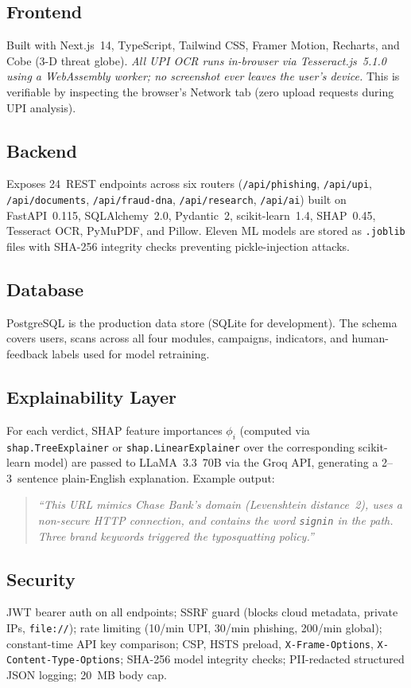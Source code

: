 \documentclass[conference]{IEEEtran}
\begin{document}
\subsection{Frontend}
Built with Next.js~14, TypeScript, Tailwind CSS, Framer Motion,
Recharts, and Cobe (3-D threat globe).
\emph{All UPI OCR runs in-browser via Tesseract.js~5.1.0 using a
WebAssembly worker; no screenshot ever leaves the user's device.}
This is verifiable by inspecting the browser's Network tab (zero upload
requests during UPI analysis).

\subsection{Backend}
Exposes 24~REST endpoints across six routers
(\texttt{/api/phishing}, \texttt{/api/upi}, \texttt{/api/documents},
\texttt{/api/fraud-dna}, \texttt{/api/research}, \texttt{/api/ai})
built on FastAPI~0.115, SQLAlchemy~2.0, Pydantic~2,
scikit-learn~1.4, SHAP~0.45, Tesseract OCR, PyMuPDF, and Pillow.
Eleven ML models are stored as \texttt{.joblib} files with SHA-256
integrity checks preventing pickle-injection attacks.

\subsection{Database}
PostgreSQL is the production data store (SQLite for development).
The schema covers users, scans across all four modules, campaigns,
indicators, and human-feedback labels used for model retraining.

\subsection{Explainability Layer}\label{sec:explayer}
For each verdict, SHAP feature importances $\phi_i$ (computed via
\texttt{shap.TreeExplainer} or \texttt{shap.LinearExplainer} over the
corresponding scikit-learn model) are passed to LLaMA~3.3~70B via the
Groq API, generating a 2--3~sentence plain-English explanation.
Example output:
\begin{quote}
\small\textit{``This URL mimics Chase Bank's domain (Levenshtein
distance~2), uses a non-secure HTTP connection, and contains the word
\texttt{signin} in the path. Three brand keywords triggered the
typosquatting policy.''}
\end{quote}

\subsection{Security}
JWT bearer auth on all endpoints; SSRF guard (blocks cloud metadata,
private IPs, \texttt{file://}); rate limiting (10/min UPI, 30/min
phishing, 200/min global); constant-time API key comparison;
CSP, HSTS preload, \texttt{X-Frame-Options},
\texttt{X-Content-Type-Options}; SHA-256 model integrity checks;
PII-redacted structured JSON logging; 20~MB body cap.
\end{document}
